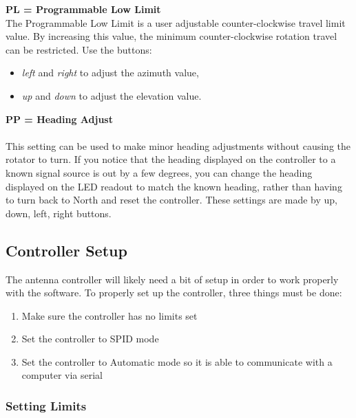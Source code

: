 \documentclass[11pt]{article} %
\begin{document}
\textbf{PL = Programmable Low Limit}
\\
The Programmable Low Limit is a user adjustable counter-clockwise travel limit value. By increasing this value, the minimum counter-clockwise rotation travel can be restricted. Use the buttons:
\begin{itemize}
\item \emph{left} and \emph{right} to adjust the azimuth value,
\item \emph{up} and \emph{down} to adjust the elevation value.
\end{itemize}
\textbf{PP = Heading Adjust}
\\ \\
This setting can be used to make minor heading adjustments without causing the rotator to turn. If you notice that the heading displayed on the controller to a known signal source is out by a few degrees, you can change the heading displayed on the LED readout to match the known heading, rather than having to turn back to North and reset the controller. These settings are made by up, down, left, right buttons.





\newpage
\subsection{Controller Setup}


The antenna controller will likely need a bit of setup in order to work properly with the software. To properly set up the controller, three things must be done: 

\begin{enumerate}
\item Make sure the controller has no limits set
\item Set the controller to SPID mode
\item Set the controller to Automatic mode so it is able to communicate with a computer via serial
\end{enumerate}

\subsubsection{Setting Limits}
\end{document}
